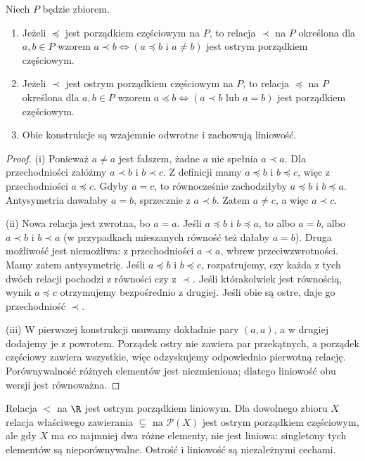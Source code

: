 \begin{twierdzenie}
\label{thm:order-strict-correspondence}
Niech $P$ będzie zbiorem.
\begin{enumerate}[label=(\roman*)]
\item Jeżeli $\preceq$ jest porządkiem częściowym na $P$,
to relacja $\prec$ na $P$ określona dla $a,b\in P$ wzorem
$a\prec b\iff(a\preceq b\text{ i }a\ne b)$ jest ostrym
porządkiem częściowym.
\item Jeżeli $\prec$ jest ostrym porządkiem częściowym na $P$,
to relacja $\preceq$ na $P$ określona dla $a,b\in P$ wzorem
$a\preceq b\iff(a\prec b\text{ lub }a=b)$
jest porządkiem częściowym.
\item Obie konstrukcje są wzajemnie odwrotne i zachowują
liniowość.
\end{enumerate}
\end{twierdzenie}
\begin{proof}
(i) Ponieważ $a\ne a$ jest fałszem, żadne $a$ nie
spełnia $a\prec a$. Dla przechodniości załóżmy
$a\prec b$ i $b\prec c$. Z definicji mamy
$a\preceq b$ i $b\preceq c$, więc z przechodniości
$a\preceq c$. Gdyby $a=c$, to równocześnie zachodziłyby
$a\preceq b$ i $b\preceq a$. Antysymetria dawałaby
$a=b$, sprzecznie z $a\prec b$. Zatem $a\ne c$, a więc
$a\prec c$.

(ii) Nowa relacja jest zwrotna, bo $a=a$. Jeśli
$a\preceq b$ i $b\preceq a$, to albo $a=b$, albo
$a\prec b$ i $b\prec a$ (w przypadkach mieszanych
równość też dałaby $a=b$). Druga możliwość jest niemożliwa:
z przechodniości $a\prec a$, wbrew przeciwzwrotności.
Mamy zatem antysymetrię. Jeśli $a\preceq b$ i
$b\preceq c$, rozpatrujemy, czy każda z tych dwóch
relacji pochodzi z równości czy z $\prec$. Jeśli którakolwiek
jest równością, wynik $a\preceq c$ otrzymujemy bezpośrednio
z drugiej. Jeśli obie są ostre, daje go przechodniość $\prec$.

(iii) W pierwszej konstrukcji usuwamy dokładnie pary
$(a,a)$, a w drugiej dodajemy je z powrotem. Porządek ostry
nie zawiera par przekątnych, a porządek częściowy zawiera
wszystkie, więc odzyskujemy odpowiednio pierwotną relację.
Porównywalność różnych elementów jest niezmieniona;
dlatego liniowość obu wersji jest równoważna.
\end{proof}

\begin{przyklad}
Relacja $<$ na $\R$ jest ostrym porządkiem liniowym.
Dla dowolnego zbioru $X$ relacja właściwego zawierania
$\subsetneq$ na $\mathcal P(X)$ jest ostrym porządkiem częściowym,
ale gdy $X$ ma co najmniej dwa różne elementy,
nie jest liniowa: singletony tych elementów są
nieporównywalne. Ostrość i liniowość są niezależnymi cechami.
\end{przyklad}

